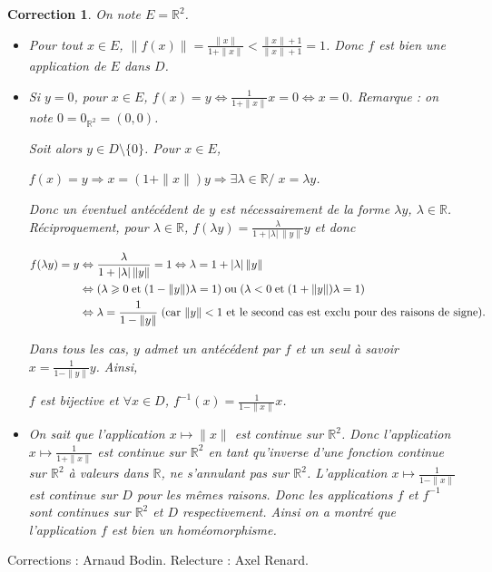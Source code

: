 \documentclass[11pt,a4paper]{article}
\newcommand{\Rr}{\mathbb{R}} \newcommand{\R}{\mathbb{R}}
\renewcommand{\ge}{\geqslant} \renewcommand{\geq}{\geqslant}
\theoremstyle{exostyle}
\newtheorem{cor}{Correction}
\newcommand{\correction}{\begin{cor}} \newcommand{\fincorrection}{\end{cor}}
\begin{document}
\correction
On note $E = \Rr^2$.
\begin{itemize}
  \item Pour tout $x\in E$, $\|f(x)\|= \frac{\|x\|}{1+\|x\|}< \frac{\|x\|+1}{\|x\|+1}=1$. Donc $f$ est bien une application de $E$ dans $D$.

  \item Si $y=0$, pour $x\in E$, $f(x)=y\Leftrightarrow \frac{1}{1+\|x\|}x=0\Leftrightarrow x=0$. Remarque : on note $0 = 0_{\Rr^2} = (0,0)$.

Soit alors $y\in D\setminus\{0\}$. Pour $x\in E$,

\begin{center}
	$f(x)=y\Rightarrow x=(1+\|x\|)y\Rightarrow\exists\lambda\in\Rr/\;x=\lambda y$.
\end{center}

Donc un éventuel antécédent de $y$ est nécessairement de la forme $\lambda y$, $\lambda\in\Rr$. Réciproquement, pour $\lambda\in\Rr$, $f(\lambda y)= \frac{\lambda}{1+|\lambda| \, \|y\|}y$ et donc

\begin{align*}\ensuremath
	f(\lambda y)=y&\Leftrightarrow \frac{\lambda}{1+|\lambda| \, \|y\|}=1\Leftrightarrow\lambda=1+|\lambda| \, \|y\|\\
	&\Leftrightarrow(\lambda\ge0\;\text{et}\;(1-\|y\|)\lambda=1)\;\text{ou}\;(\lambda<0\;\text{et}\;(1+\|y\|)\lambda=1)\\
	&\Leftrightarrow\lambda= \frac{1}{1-\|y\|}\;\text{(car $\|y\|<1$ et le second cas est exclu pour des raisons de signe)}.
\end{align*}

Dans tous les cas, $y$ admet un antécédent par $f$ et un seul à savoir $x= \frac{1}{1-\|y\|}y$. Ainsi,

\begin{center}
	$f$ est bijective et $\forall x\in D$, $f^{-1}(x)= \frac{1}{1-\|x\|}x$.
\end{center}

  \item On sait que l'application $x\mapsto\|x\|$ est continue sur $\Rr^2$. Donc l'application $x\mapsto \frac{1}{1+\|x\|}$ est continue sur $\Rr^2$ en tant qu'inverse d'une fonction continue sur $\Rr^2$ à valeurs dans $\Rr$, ne s'annulant pas sur $\Rr^2$. L'application $x\mapsto \frac{1}{1-\|x\|}$ est continue sur $D$ pour les mêmes raisons. Donc les applications $f$ et $f^{-1}$ sont continues sur $\Rr^2$ et $D$ respectivement. Ainsi on a montré que
l'application $f$ est bien un homéomorphisme.
\end{itemize}
\fincorrection
\finexercice


\bigskip

Corrections : Arnaud Bodin. Relecture : Axel Renard.
\end{document}
